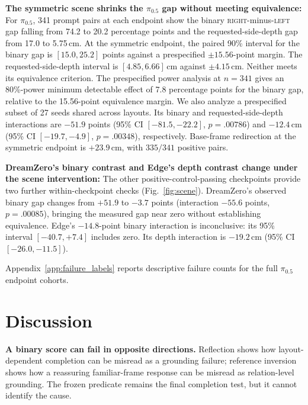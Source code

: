 \documentclass[letterpaper,10pt,conference]{ieeeconf}%
\newcommand{\tokL}{\textsc{left}}
\newcommand{\tokR}{\textsc{right}}
\newcommand{\tightparagraph}[1]{\vspace{0.25em}\noindent\textbf{#1}}
\begin{document}
\tightparagraph{The symmetric scene shrinks the $\pi_{0.5}$ gap without meeting equivalence:}
For $\pi_{0.5}$, 341 prompt pairs at each endpoint show the binary \tokR{}-minus-\tokL{} gap falling from 74.2 to 20.2 percentage points and the requested-side-depth gap from 17.0 to 5.75\,cm.
At the symmetric endpoint, the paired 90\% interval for the binary gap is $[15.0,25.2]$ points against a prespecified $\pm15.56$-point margin.
The requested-side-depth interval is $[4.85,6.66]$\,cm against $\pm4.15$\,cm.
Neither meets its equivalence criterion.
The prespecified power analysis at $n=341$ gives an 80\%-power minimum detectable effect of 7.8 percentage points for the binary gap, relative to the 15.56-point equivalence margin.
We also analyze a prespecified subset of 27 seeds shared across layouts.
Its binary and requested-side-depth interactions are $-51.9$ points (95\% CI $[-81.5,-22.2]$, $p=.00786$) and $-12.4$\,cm (95\% CI $[-19.7,-4.9]$, $p=.00348$), respectively.
Base-frame redirection at the symmetric endpoint is $+23.9$\,cm, with $335/341$ positive pairs.

\tightparagraph{DreamZero's binary contrast and Edge's depth contrast change under the scene intervention:}
The other positive-control-passing checkpoints provide two further within-checkpoint checks (Fig.~\ref{fig:scene}).
DreamZero's observed binary gap changes from $+51.9$ to $-3.7$ points (interaction $-55.6$ points, $p=.00085$), bringing the measured gap near zero without establishing equivalence.
Edge's $-14.8$-point binary interaction is inconclusive: its 95\% interval $[-40.7,+7.4]$ includes zero.
Its depth interaction is $-19.2$\,cm (95\% CI $[-26.0,-11.5]$).

Appendix~\ref{app:failure_labels} reports descriptive failure counts for the full $\pi_{0.5}$ endpoint cohorts.

\section{Discussion}
\label{sec:discussion}

\tightparagraph{A binary score can fail in opposite directions.}
Reflection shows how layout-dependent completion can be misread as a grounding failure; reference inversion shows how a reassuring familiar-frame response can be misread as relation-level grounding.
The frozen predicate remains the final completion test, but it cannot identify the cause.
\end{document}
